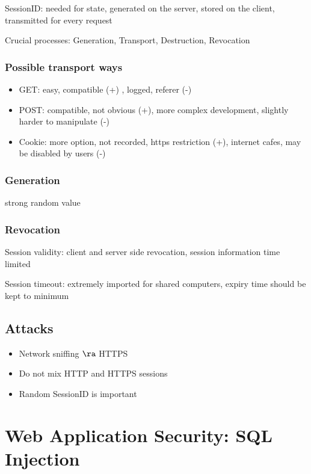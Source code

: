 \documentclass[fs, footer]{latex4ei}
\begin{document}
\begin{multicols*}{4}
SessionID: needed for state, generated on the server, stored on the client, transmitted for every request

Crucial processes: Generation, Transport, Destruction, Revocation

 \subsubsection{Possible transport ways}
\begin{itemize}
 	\item GET: easy, compatible (+) , logged, referer (-)
 	\item POST: compatible, not obvious (+), more complex development, slightly harder to manipulate (-)
 	\item Cookie: more option, not recorded, https restriction (+), internet cafes, may be disabled by users (-)
 \end{itemize} 

 \subsubsection{Generation} strong random value

 \subsubsection{Revocation}
 Session validity: client and server side revocation, session information time limited

 Session timeout: extremely imported for shared computers, expiry time should be kept to minimum

 \subsection{Attacks}
 \begin{itemize}
 	\item Network sniffing $\ra$ HTTPS
 	\item Do not mix HTTP and HTTPS sessions
 	\item Random SessionID is important
 \end{itemize}
\section{Web Application Security: SQL Injection}
\end{multicols*}
\end{document}
